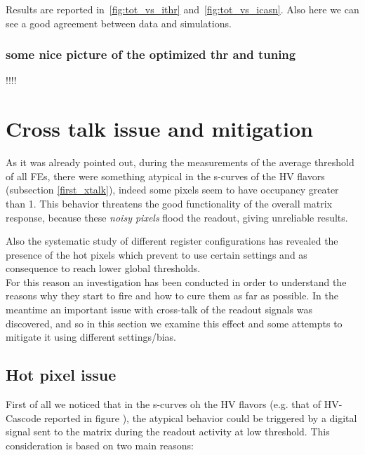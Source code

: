 Results are reported in~\autoref{fig:tot_vs_ithr} and~\autoref{fig:tot_vs_icasn}. Also here we can see a good agreement between data and simulations.

\subsubsection{some nice picture of the optimized thr and tuning}

!!!!


\section{Cross talk issue and mitigation} \label{sec:xtalk}

As it was already pointed out, during the measurements of the average threshold of all FEs, there were something atypical in the s-curves of the HV flavors (subsection \vref{first_xtalk}), indeed some pixels seem to have occupancy greater than 1. This behavior threatens the good functionality of the overall matrix response, because these \textit{noisy pixels} flood the readout, giving unreliable results.

Also the systematic study of different register configurations has revealed the presence of the hot pixels which prevent to use certain settings and as consequence to reach lower global thresholds. \\

For this reason an investigation has been conducted in order to understand the reasons why they start to fire and how to cure them as far as possible.
In the meantime an important issue with cross-talk of the readout signals was discovered, and so in this section we examine this effect and some attempts to mitigate it using different settings/bias.


\subsection{Hot pixel issue}

First of all we noticed that in the s-curves oh the HV flavors (e.g. that of HV-Cascode reported in figure ), the atypical behavior could be triggered by a digital signal sent to the matrix during the readout activity at low threshold. This consideration is based on two main reasons:

